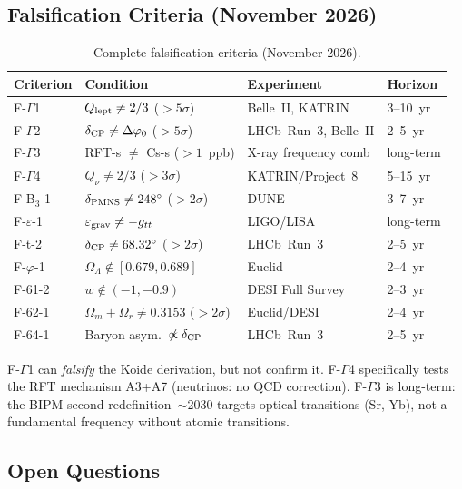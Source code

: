 \documentclass[12pt]{iopart}
\begin{document}
	\subsection{Falsification Criteria (November 2026)}
	\label{sec:falsif_nov2026}
	
	\begin{table}[ht]
		\centering\small
		\caption{Complete falsification criteria (November 2026).}
		\begin{tabular}{llll}
			\hline
			\textbf{Criterion} & \textbf{Condition} & \textbf{Experiment} & \textbf{Horizon} \\
			\hline
			F-$\Gamma$1 & $Q_{\rm lept}\neq2/3$ ($>5\sigma$) & Belle~II, KATRIN & 3--10~yr \\
			F-$\Gamma$2 & $\delta_{\rm CP}\neq\Delta\varphi_0$ ($>5\sigma$) & LHCb~Run~3, Belle~II & 2--5~yr \\
			F-$\Gamma$3 & RFT-s $\neq$ Cs-s ($>1$~ppb) & X-ray frequency comb & long-term \\
			F-$\Gamma$4 & $Q_\nu\neq2/3$ ($>3\sigma$) & KATRIN/Project~8 & 5--15~yr \\
			F-B$_3$-1 & $\delta_{\rm PMNS}\neq248^\circ$ ($>2\sigma$) & DUNE & 3--7~yr \\
			F-$\varepsilon$-1 & $\varepsilon_{\rm grav}\neq{-}g_{tt}$ & LIGO/LISA & long-term \\
			F-t-2 & $\delta_{\rm CP}\neq68.32^\circ$ ($>2\sigma$) & LHCb~Run~3 & 2--5~yr \\
			F-$\varphi$-1 & $\Omega_\Lambda\notin[0.679,0.689]$ & Euclid & 2--4~yr \\
			F-61-2 & $w\notin(-1,-0.9)$ & DESI Full Survey & 2--3~yr \\
			F-62-1 & $\Omega_m+\Omega_r\neq0.3153$ ($>2\sigma$) & Euclid/DESI & 2--4~yr \\
			F-64-1 & Baryon asym.\ $\not\propto\delta_{\rm CP}$ & LHCb~Run~3 & 2--5~yr \\
			\hline
		\end{tabular}
	\end{table}
	
	F-$\Gamma$1 can \textit{falsify} the Koide derivation, but not confirm it.
	F-$\Gamma$4 specifically tests the RFT mechanism A3+A7 (neutrinos: no QCD correction).
	F-$\Gamma$3 is long-term: the BIPM second redefinition~$\sim$2030 targets
	optical transitions (Sr, Yb), not a fundamental frequency without atomic transitions.
	
	\subsection{Open Questions}
\end{document}
